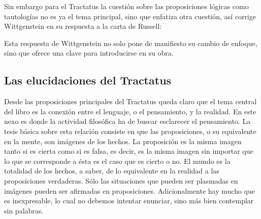 Sin embargo para el Tractatus la cuestión sobre las proposiciones lógicas como
tautologías no es ya el tema principal, sino que enfatiza otra cuestión, así
corrige Wittgenstein en su respuesta a la carta de Russell:

Esta respuesta de Wittgenstein no solo pone de manifiesto su cambio de enfoque,
sino que ofrece una clave para introducirse en su obra. 


\subsection{Las elucidaciones del Tractatus}
Desde las proposiciones principales del Tractatus queda claro que el tema
central del libro es la conexión entre el lenguaje, o el pensamiento, y la
realidad.  
En este nexo es donde la actividad filosófica ha de buscar esclarecer el
pensamiento.
La tesis básica sobre esta relación consiste en que las proposiciones, o su
equivalente en la mente, son imágenes de los hechos.
La proposición es la misma imagen tanto si es cierta como si es falsa, es decir,
es la misma imagen sin importar que lo que se corresponde a ésta es el caso que
es cierto o no. El mundo es la totalidad de los hechos, a saber, de lo
equivalente en la realidad a las proposiciones verdaderas.
Sólo las situaciones que pueden ser plasmadas en imágenes pueden ser afirmadas
en proposiciones. Adicionalmente hay mucho que es inexpresable, lo cual no
debemos intentar enunciar, sino más bien contemplar sin palabras.\autocite[cf.
p.19]{IWT}

